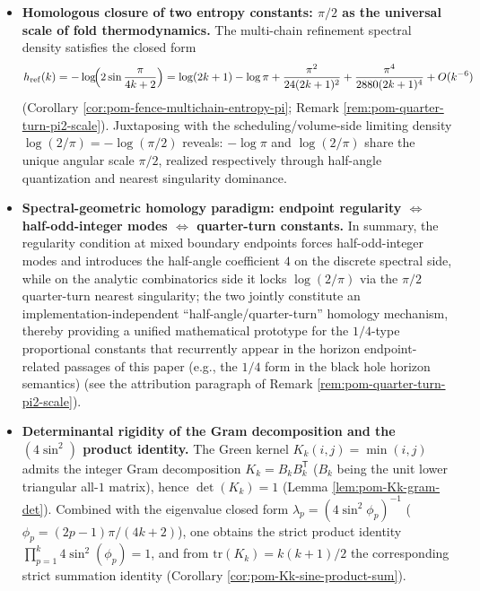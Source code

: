 \begin{enumerate}
\begin{itemize}
    \item \textbf{Homologous closure of two entropy constants: \texorpdfstring{\(\pi/2\)}{pi/2} as the universal scale of fold thermodynamics.}
    The multi-chain refinement spectral density satisfies the closed form
    \[
    h_{\mathrm{ref}}(k)=-\log\!\Bigl(2\sin\frac{\pi}{4k+2}\Bigr)
    =\log(2k+1)-\log\pi+\frac{\pi^2}{24(2k+1)^2}+\frac{\pi^4}{2880(2k+1)^4}+O(k^{-6})
    \]
    (Corollary \ref{cor:pom-fence-multichain-entropy-pi}; Remark \ref{rem:pom-quarter-turn-pi2-scale}).
    Juxtaposing with the scheduling/volume-side limiting density \(\log(2/\pi)=-\log(\pi/2)\) reveals: \(-\log\pi\) and \(\log(2/\pi)\) share the unique angular scale \(\pi/2\), realized respectively through half-angle quantization and nearest singularity dominance.

    \item \textbf{Spectral-geometric homology paradigm: endpoint regularity \texorpdfstring{\(\Longleftrightarrow\)}{<->} half-odd-integer modes \texorpdfstring{\(\Longleftrightarrow\)}{<->} quarter-turn constants.}
    In summary, the regularity condition at mixed boundary endpoints forces half-odd-integer modes and introduces the half-angle coefficient \(4\) on the discrete spectral side, while on the analytic combinatorics side it locks \(\log(2/\pi)\) via the \(\pi/2\) quarter-turn nearest singularity;
    the two jointly constitute an implementation-independent ``half-angle/quarter-turn'' homology mechanism, thereby providing a unified mathematical prototype for the \(1/4\)-type proportional constants that recurrently appear in the horizon endpoint-related passages of this paper (e.g., the \(1/4\) form in the black hole horizon semantics) (see the attribution paragraph of Remark \ref{rem:pom-quarter-turn-pi2-scale}).

    \item \textbf{Determinantal rigidity of the Gram decomposition and the \texorpdfstring{\((4\sin^2)\)}{(4 sin^2)} product identity.}
    The Green kernel \(K_k(i,j)=\min(i,j)\) admits the integer Gram decomposition \(K_k=B_kB_k^{\mathsf T}\) (\(B_k\) being the unit lower triangular all-\(1\) matrix), hence \(\det(K_k)=1\) (Lemma \ref{lem:pom-Kk-gram-det}).
    Combined with the eigenvalue closed form \(\lambda_p=(4\sin^2\phi_p)^{-1}\) (\(\phi_p=(2p-1)\pi/(4k+2)\)), one obtains the strict product identity
    \(
    \prod_{p=1}^{k}4\sin^2(\phi_p)=1
    \), and from \(\mathrm{tr}(K_k)=k(k+1)/2\) the corresponding strict summation identity (Corollary \ref{cor:pom-Kk-sine-product-sum}).


\end{itemize}
\end{enumerate}
